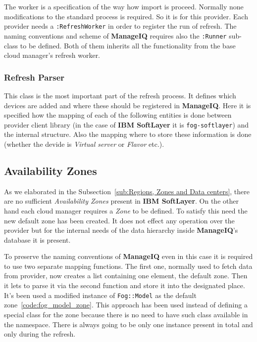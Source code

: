 The worker is a specification of the way how import is proceed. Normally none modifications to the standard process is required. So it is for this provider. Each provider needs a \texttt{:RefreshWorker} in order to register the run of refresh. The naming conventions and scheme of \textbf{ManageIQ} requires also the \texttt{:Runner} sub-class to be defined. Both of them inherits all the functionality from the base cloud manager's refresh worker.

\subsubsection{Refresh Parser}
\label{subs:Refresh Parser}

This class is the most important part of the refresh process. It defines which devices are added and where these should be registered in \textbf{ManageIQ}. Here it is specified how the mapping of each of the following entities is done between provider client library (in the case of \textbf{IBM SoftLayer} it is \texttt{fog-softlayer}) and the internal structure. Also the mapping where to store these information is done (whether the devide is \emph{Virtual server} or \emph{Flavor} etc.).

\subsection{Availability Zones}
\label{sub:Availability Zones}

As we elaborated in the Subsection~\ref{sub:Regions, Zones and Data centers}, there are no sufficient \emph{Availability Zones} present in \textbf{IBM SoftLayer}. On the other hand each cloud manager requires a \emph{Zone} to be defined. To satisfy this need the new default zone has been created. It does not effect any operation over the provider but for the internal needs of the data hierarchy inside \textbf{ManageIQ}'s database it is present.

To preserve the naming conventions of \textbf{ManageIQ} even in this case it is required to use two separate mapping functions. The first one, normally used to fetch data from provider, now creates a list containing one element, the default zone. Then it lets to parse it via the second function and store it into the designated place. It's been used a modified instance of \texttt{Fog::Model} as the default zone~\ref{code:fog_model_zone}. This approach has been used instead of defining a special class for the zone because there is no need to have such class available in the namespace. There is always going to be only one instance present in total and only during the refresh.

